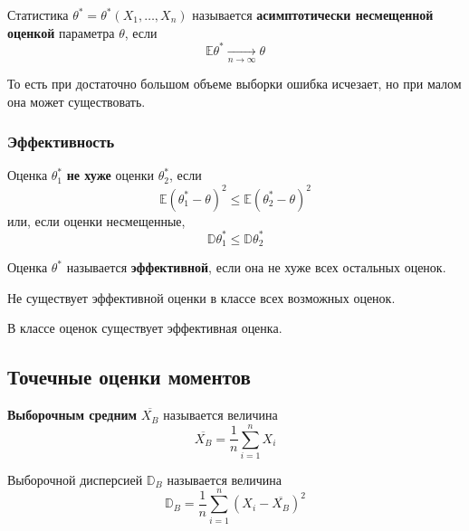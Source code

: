 \begin{definition}
    Статистика \(\theta^* = \theta^*(X_1, \dots, X_n)\) называется \textbf{асимптотически несмещенной оценкой} параметра \(\theta\), если
    \[\mathbb{E} \theta^* \xrightarrow[n \to \infty ]{} \theta\]
\end{definition}

\begin{remark}
    То есть при достаточно большом объеме выборки ошибка исчезает, но при малом она может существовать.
\end{remark}

\subsubsection{Эффективность}

\begin{definition}
    Оценка \(\theta_1^*\) \textbf{не хуже} оценки \(\theta_2^*\), если
    \[\mathbb{E} (\theta_1^* - \theta)^2 \leq \mathbb{E} (\theta_2^* - \theta)^2\]
    или, если оценки несмещенные,
    \[\mathbb{D} \theta_1^* \leq \mathbb{D} \theta_2^*\]
\end{definition}

\begin{definition}
    Оценка \(\theta^*\) называется \textbf{эффективной}, если она не хуже всех остальных оценок.
\end{definition}

\begin{theorem}
    Не существует эффективной оценки в классе всех возможных оценок.
\end{theorem}

\begin{theorem}
    В классе \? оценок существует эффективная оценка.
\end{theorem}

\subsection{Точечные оценки моментов}

\begin{definition}
    \textbf{Выборочным средним} \(\overline{X_B}\) называется величина
    \[\overline{X_B} = \frac{1}{n} \sum_{i=1}^{n} X_i\]
\end{definition}

\begin{definition}
    Выборочной дисперсией \(\mathbb{D}_B\) называется величина
    \[\mathbb{D}_B = \frac{1}{n} \sum_{i=1}^{n} (X_i - \overline{X_B})^2\]
\end{definition}

